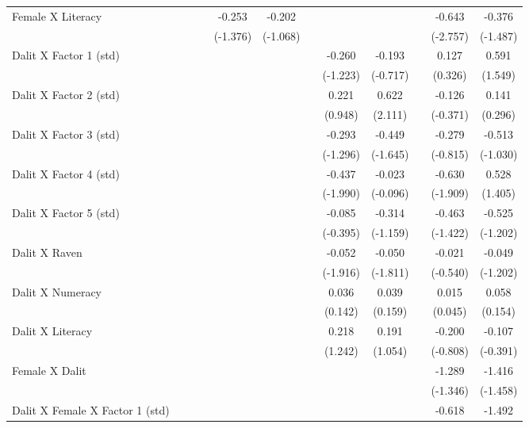 {\begin{longtable}{@{\extracolsep{\fill}}lccccccccccc}
    Female X Literacy &   &   &   & -0.253 & -0.202 &   &   &   &   & -0.643 & -0.376 \\
      &   &   &   & (-1.376) & (-1.068) &   &   &   &   & (-2.757) & (-1.487) \\
    Dalit X Factor 1 (std) &   &   &   &   &   &   & -0.260 & -0.193 &   & 0.127 & 0.591 \\
      &   &   &   &   &   &   & (-1.223) & (-0.717) &   & (0.326) & (1.549) \\
    Dalit X Factor 2 (std) &   &   &   &   &   &   & 0.221 & 0.622 &   & -0.126 & 0.141 \\
      &   &   &   &   &   &   & (0.948) & (2.111) &   & (-0.371) & (0.296) \\
    Dalit X Factor 3 (std) &   &   &   &   &   &   & -0.293 & -0.449 &   & -0.279 & -0.513 \\
      &   &   &   &   &   &   & (-1.296) & (-1.645) &   & (-0.815) & (-1.030) \\
    Dalit X Factor 4 (std) &   &   &   &   &   &   & -0.437 & -0.023 &   & -0.630 & 0.528 \\
      &   &   &   &   &   &   & (-1.990) & (-0.096) &   & (-1.909) & (1.405) \\
    Dalit X Factor 5 (std) &   &   &   &   &   &   & -0.085 & -0.314 &   & -0.463 & -0.525 \\
      &   &   &   &   &   &   & (-0.395) & (-1.159) &   & (-1.422) & (-1.202) \\
    Dalit X Raven &   &   &   &   &   &   & -0.052 & -0.050 &   & -0.021 & -0.049 \\
      &   &   &   &   &   &   & (-1.916) & (-1.811) &   & (-0.540) & (-1.202) \\
    Dalit X Numeracy &   &   &   &   &   &   & 0.036 & 0.039 &   & 0.015 & 0.058 \\
      &   &   &   &   &   &   & (0.142) & (0.159) &   & (0.045) & (0.154) \\
    Dalit X Literacy &   &   &   &   &   &   & 0.218 & 0.191 &   & -0.200 & -0.107 \\
      &   &   &   &   &   &   & (1.242) & (1.054) &   & (-0.808) & (-0.391) \\
    Female X Dalit &   &   &   &   &   &   &   &   &   & -1.289 & -1.416 \\
      &   &   &   &   &   &   &   &   &   & (-1.346) & (-1.458) \\
    Dalit X Female X Factor 1 (std) &   &   &   &   &   &   &   &   &   & -0.618 & -1.492 \\

\end{longtable}}
